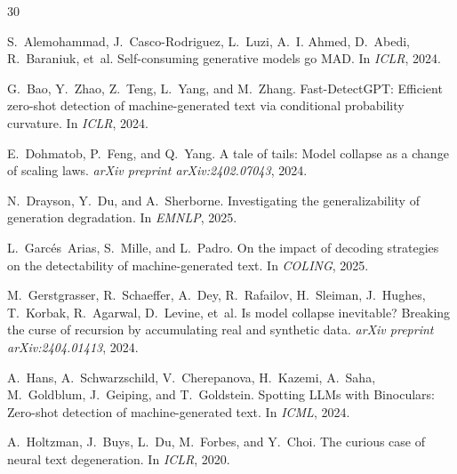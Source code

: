\documentclass[11pt,a4paper]{article}
\begin{document}


\begin{thebibliography}{30}

S.~Alemohammad, J.~Casco-Rodriguez, L.~Luzi, A.~I. Ahmed, D.~Abedi, R.~Baraniuk, et~al.
\newblock Self-consuming generative models go {MAD}.
\newblock In \emph{ICLR}, 2024.

G.~Bao, Y.~Zhao, Z.~Teng, L.~Yang, and M.~Zhang.
\newblock Fast-{DetectGPT}: Efficient zero-shot detection of machine-generated text via conditional probability curvature.
\newblock In \emph{ICLR}, 2024.

E.~Dohmatob, P.~Feng, and Q.~Yang.
\newblock A tale of tails: Model collapse as a change of scaling laws.
\newblock \emph{arXiv preprint arXiv:2402.07043}, 2024.

N.~Drayson, Y.~Du, and A.~Sherborne.
\newblock Investigating the generalizability of generation degradation.
\newblock In \emph{EMNLP}, 2025.

L.~Garc{\'e}s~Arias, S.~Mille, and L.~Padro.
\newblock On the impact of decoding strategies on the detectability of machine-generated text.
\newblock In \emph{COLING}, 2025.

M.~Gerstgrasser, R.~Schaeffer, A.~Dey, R.~Rafailov, H.~Sleiman, J.~Hughes, T.~Korbak, R.~Agarwal, D.~Levine, et~al.
\newblock Is model collapse inevitable? {Breaking} the curse of recursion by accumulating real and synthetic data.
\newblock \emph{arXiv preprint arXiv:2404.01413}, 2024.

A.~Hans, A.~Schwarzschild, V.~Cherepanova, H.~Kazemi, A.~Saha, M.~Goldblum, J.~Geiping, and T.~Goldstein.
\newblock Spotting {LLMs} with {Binoculars}: Zero-shot detection of machine-generated text.
\newblock In \emph{ICML}, 2024.

A.~Holtzman, J.~Buys, L.~Du, M.~Forbes, and Y.~Choi.
\newblock The curious case of neural text degeneration.
\newblock In \emph{ICLR}, 2020.


\end{thebibliography}
\end{document}
